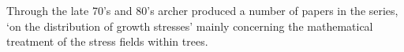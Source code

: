 Through the late 70's and 80's archer produced a number of papers in the series,
`on the distribution of growth stresses' \cite{Archer_1974}\cite{archer1976}\cite{Archer_1979}\cite{Archer_1981}\cite{Archer_1985} mainly concerning the
mathematical treatment of the stress fields within trees. 